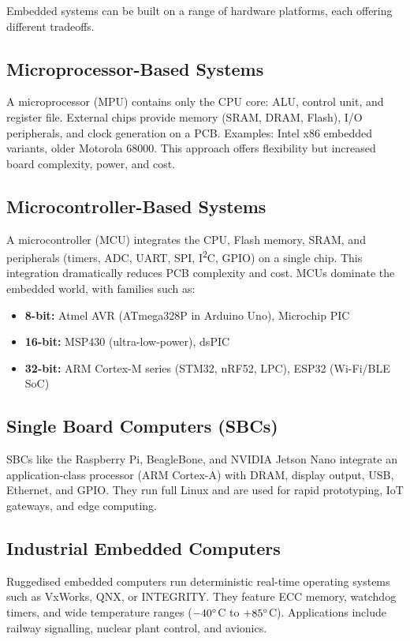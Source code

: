 Embedded systems can be built on a range of hardware platforms, each offering different tradeoffs.

\subsection{Microprocessor-Based Systems}
A microprocessor (MPU) contains only the CPU core: ALU, control unit, and register file. External chips provide memory (SRAM, DRAM, Flash), I/O peripherals, and clock generation on a PCB. Examples: Intel x86 embedded variants, older Motorola 68000. This approach offers flexibility but increased board complexity, power, and cost.

\subsection{Microcontroller-Based Systems}
A microcontroller (MCU) integrates the CPU, Flash memory, SRAM, and peripherals (timers, ADC, UART, SPI, I\textsuperscript{2}C, GPIO) on a single chip. This integration dramatically reduces PCB complexity and cost. MCUs dominate the embedded world, with families such as:
\begin{itemize}[nosep]
  \item \textbf{8-bit:} Atmel AVR (ATmega328P in Arduino Uno), Microchip PIC
  \item \textbf{16-bit:} MSP430 (ultra-low-power), dsPIC
  \item \textbf{32-bit:} ARM Cortex-M series (STM32, nRF52, LPC), ESP32 (Wi-Fi/BLE SoC)
\end{itemize}

\subsection{Single Board Computers (SBCs)}
SBCs like the Raspberry Pi, BeagleBone, and NVIDIA Jetson Nano integrate an application-class processor (ARM Cortex-A) with DRAM, display output, USB, Ethernet, and GPIO. They run full Linux and are used for rapid prototyping, IoT gateways, and edge computing.

\subsection{Industrial Embedded Computers}
Ruggedised embedded computers run deterministic real-time operating systems such as VxWorks, QNX, or INTEGRITY. They feature ECC memory, watchdog timers, and wide temperature ranges ($-40^\circ$C to $+85^\circ$C). Applications include railway signalling, nuclear plant control, and avionics.

